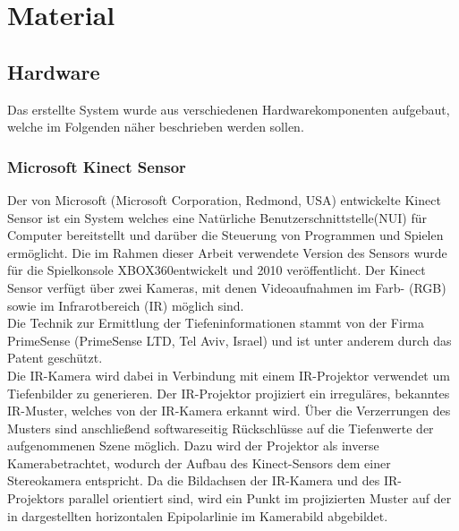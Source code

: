 \chapter{Material}
\label{chap:material}
\section{Hardware}
Das erstellte System wurde aus verschiedenen Hardwarekomponenten aufgebaut, welche im Folgenden näher beschrieben werden sollen. 

\subsection{Microsoft Kinect Sensor}
Der von Microsoft (Microsoft Corporation, Redmond, USA) entwickelte Kinect Sensor ist ein System welches eine Natürliche Benutzerschnittstelle\red[Definition] (NUI) für Computer  bereitstellt und darüber die Steuerung von Programmen und Spielen ermöglicht. Die im Rahmen dieser Arbeit verwendete Version des Sensors wurde für die Spielkonsole XBOX360\red[TM] entwickelt und 2010 veröffentlicht. Der Kinect Sensor verfügt über zwei Kameras, mit denen Videoaufnahmen im Farb- (RGB) sowie im Infrarotbereich (IR) möglich sind.\\

Die Technik zur Ermittlung der Tiefeninformationen stammt von der Firma PrimeSense (PrimeSense LTD, Tel Aviv, Israel) und ist unter anderem durch das Patent \cite{Freedman2008} geschützt. \\
Die IR-Kamera wird dabei in Verbindung mit einem IR-Projektor verwendet um Tiefenbilder zu generieren. Der IR-Projektor projiziert ein irreguläres, bekanntes IR-Muster, welches von der IR-Kamera erkannt wird. Über die Verzerrungen des Musters sind anschließend softwareseitig Rückschlüsse auf die Tiefenwerte der aufgenommenen Szene möglich. Dazu wird der Projektor als inverse Kamera\red[ (Quelle?)] betrachtet, wodurch der Aufbau des Kinect-Sensors dem einer Stereokamera entspricht. Da die Bildachsen der IR-Kamera und des IR-Projektors parallel orientiert sind, wird ein Punkt im projizierten Muster auf der in  dargestellten horizontalen Epipolarlinie \red[$e$] im Kamerabild abgebildet. 

